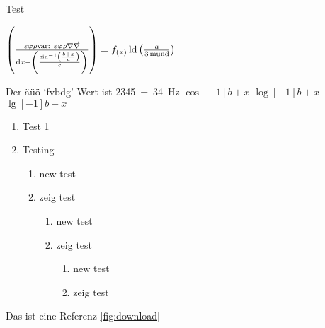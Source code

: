 \documentclass{article}
\begin{document}


Test

$\bracfrac{\epsilon\phi\rho\text{var: }\varepsilon\varphi\varrho\nablanovec\nabla}{\d x - \l(\frac{\sin[-1]{\frac{b+x}{c}}}{c}\r)} = \f{f}{x} \ld{\frac{a}{\SI{3}{\m und}}}$

Der äüö \lq fvbdg\rq{} Wert ist \SI{2345(34)}{\Hz}
$\cos[-1]{{b+x}}$
$\log[-1]{{b+x}}$
$\lg[-1]{{b+x}}$

\begin{enumerate}
	\item Test 1
	\item Testing
	\begin{enumerate}
		\item new test
		\item zeig test
		\begin{enumerate}
			\item new test
			\item zeig test
			\begin{enumerate}
				\item new test
				\item zeig test
			\end{enumerate}
		\end{enumerate}
	\end{enumerate}
\end{enumerate}

Das ist eine Referenz \ref{fig:download}
\end{document}
